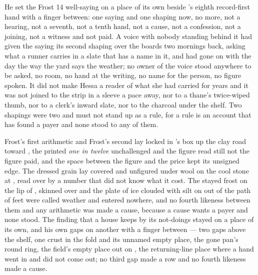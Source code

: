He set the Frost 14 well-saying on a place of its own beside 's eighth record-first hand with a finger between: one saying and one shaping now, no more, not a hearing, not a seventh, not a tenth hand, not a cause, not a confession, not a joining, not a witness and not paid. A voice with nobody standing behind it had given the saying its second shaping over the boards two mornings back, asking what a runner carries in a slate that has a name in it, and had gone on with the day the way the yard says the weather; no owner of the voice stood anywhere to be asked, no room, no hand at the writing, no name for the person, no figure spoken. It did not make Hessa a reader of what she had carried for years and it was not joined to the strip in a sleeve a pace away, nor to a thane's twice-wiped thumb, nor to a clerk's inward slate, nor to the charcoal under the shelf. Two shapings were two and must not stand up as a rule, for a rule is an account that has found a payer and none stood to any of them.

Frost's first arithmetic and Frost's second lay locked in 's box up the clay road toward , the printed \emph{one in twelve} unchallenged and the figure read still not the figure paid, and the space between the figure and the price kept its unsigned edge. The dressed grain lay covered and unfigured under wool on the cool stone at , read over by a number that did not know what it cost. The stayed frost on the lip of ,  skinned over and the plate of ice clouded with silt on  out of the path of feet were called weather and entered nowhere, and no fourth likeness between them and any arithmetic was made a cause, because a cause wants a payer and none stood. The finding that a house keeps by its not-doings stayed on a place of its own, and his own gaps on another with a finger between --- two gaps above the shelf, one crust in the fold and its unnamed empty place, the gone pan's round ring, the field's empty place out on , the returning-line place where a hand went in and did not come out; no third gap made a row and no fourth likeness made a cause.

\scenebreak

